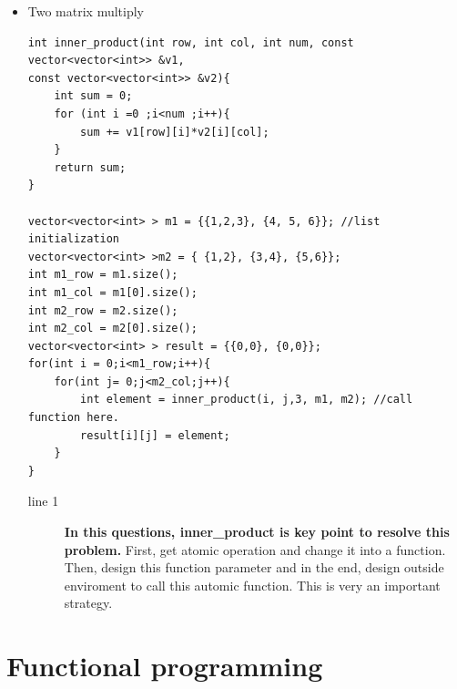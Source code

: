 \documentclass[a4paper,11pt,twoside]{book}
\begin{document}
\begin{itemize}
	\item Two matrix multiply
\begin{lstlisting}[]
int inner_product(int row, int col, int num, const vector<vector<int>> &v1, 
const vector<vector<int>> &v2){
	int sum = 0;
	for (int i =0 ;i<num ;i++){
		sum += v1[row][i]*v2[i][col];
	}
	return sum;
}

vector<vector<int> > m1 = {{1,2,3}, {4, 5, 6}}; //list initialization
vector<vector<int> >m2 = { {1,2}, {3,4}, {5,6}};
int m1_row = m1.size();
int m1_col = m1[0].size();
int m2_row = m2.size();
int m2_col = m2[0].size();
vector<vector<int> > result = {{0,0}, {0,0}};
for(int i = 0;i<m1_row;i++){
	for(int j= 0;j<m2_col;j++){
		int element = inner_product(i, j,3, m1, m2); //call function here.
		result[i][j] = element;
	}
}	
\end{lstlisting}
	
	\begin{description}	
		\item[line 1] \textbf{In this questions, inner\_product is key point to resolve this problem.} First, get atomic operation and change it into a function. Then, design this function parameter and in the end, design outside enviroment to call this automic function. This is very an important strategy. 
	\end{description}
	
\end{itemize}


\chapter{Functional programming}
\end{document}
